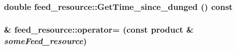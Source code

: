 \label{classfeed__resource_acf098bd410e8170e2bbd82be48b2bf40}
\hypertarget{classfeed__resource_a522cc52c960d9fc6bceb3bd173504a09}{
\subsubsection[{GetTime\_\-since\_\-dunged}]{\setlength{\rightskip}{0pt plus 5cm}double feed\_\-resource::GetTime\_\-since\_\-dunged () const}}
\label{classfeed__resource_a522cc52c960d9fc6bceb3bd173504a09}
\hypertarget{classfeed__resource_af85c55e18f378ff9f64c962450237989}{
\subsubsection[{operator=}]{ \& feed\_\-resource::operator= (const {\bf product} \& {\em someFeed\_\-resource})}}
\label{classfeed__resource_af85c55e18f378ff9f64c962450237989}


